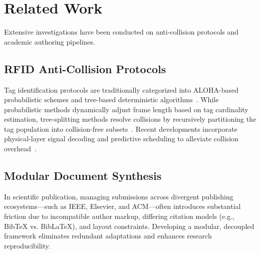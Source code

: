 
\section{Related Work}
\label{sec:related_work}

Extensive investigations have been conducted on anti-collision protocols and academic authoring pipelines.

\subsection{RFID Anti-Collision Protocols}
Tag identification protocols are traditionally categorized into ALOHA-based probabilistic schemes and tree-based deterministic algorithms~\cite{EPC-C1-Gen2}. While probabilistic methods dynamically adjust frame length based on tag cardinality estimation, tree-splitting methods resolve collisions by recursively partitioning the tag population into collision-free subsets~\cite{TAD}. Recent developments incorporate physical-layer signal decoding and predictive scheduling to alleviate collision overhead~\cite{RFID-in-IOT}.

\subsection{Modular Document Synthesis}
In scientific publication, managing submissions across divergent publishing ecosystems—such as IEEE, Elsevier, and ACM—often introduces substantial friction due to incompatible author markup, differing citation models (e.g., BibTeX vs. BibLaTeX), and layout constraints. Developing a modular, decoupled framework eliminates redundant adaptations and enhances research reproducibility.
